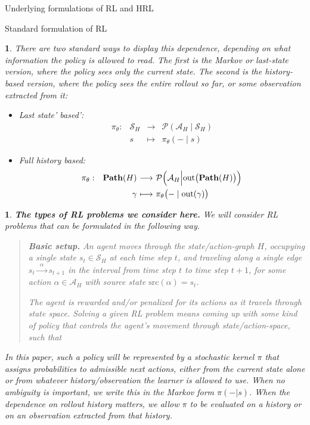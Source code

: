 \documentclass[11pt]{article}
\newtheorem{ermark}[subsubsection]{}
\begin{document}
\begin{section}{Underlying formulations of RL and HRL}
\begin{subsection}{Standard formulation of RL}
\begin{ermark}
There are two standard ways to display this dependence, depending on what information the policy is allowed to read. The first is the Markov or last-state version, where the policy sees only the current state. The second is the history-based version, where the policy sees the entire rollout so far, or some observation extracted from it:
\begin{itemize}
\item
Last state' based':
$$
\begin{array}{rrcl}
\pi_{\theta}:
&\mathcal{S}_{H}
&
\!\!\!\!\longrightarrow\!\!\!\!
&\mathcal{P}(\mathcal{A}_{H}\mid\mathcal{S}_{H}) \\[5pt]
&
s
&
\!\!\!\!\longmapsto\!\!\!\!
& \pi_{\theta}(-\mid s)
\end{array}
$$
\item
Full history based:
$$
\begin{array}{rrcl}
\pi_{\theta}:
&\bold{Path}(H)
&
\!\!\!\!\longrightarrow\!\!\!\!
&\mathcal{P}\Big(\mathcal{A}_{H}\Big|\text{out}\big(\bold{Path}(H)\big)\Big) \\[7pt]
&
\gamma
&
\!\!\!\!\longmapsto\!\!\!\!
& \pi_{\theta}\big(-\mid \text{out}(\gamma)\big)
\end{array}
$$
\end{itemize}
\end{ermark}

\begin{ermark}
{\bf The types of RL problems we consider here.}
\normalfont
We will consider RL problems that can be formulated in the following way.

\begin{quote}
{\bf Basic setup.}
An agent moves through the state/action-graph $H$, occupying a single state $s_{t}\in\mathcal{S}_{H}$ at each time step $t$, and traveling along a single edge 
$
s_{t}\xrightarrow{\ \ \alpha\ \ }s_{t+1}
$
in the interval from time step $t$ to time step $t+1$, for some action $\alpha\in\mathcal{A}_{H}$ with source state $\text{src}(\alpha)=s_{t}$.

The agent is rewarded and/or penalized for its actions as it travels through state space. {\em Solving} a given RL problem means coming up with some kind of policy that controls the agent's movement through state/action-space, such that 
\end{quote}
In this paper, such a policy will be represented by a stochastic kernel $\pi$ that assigns probabilities to admissible next actions, either from the current state alone or from whatever history/observation the learner is allowed to use. When no ambiguity is important, we write this in the Markov form $\pi(-|s)$. When the dependence on rollout history matters, we allow $\pi$ to be evaluated on a history or on an observation extracted from that history.
\end{ermark}
 

\end{subsection}
\end{section}
\end{document}
